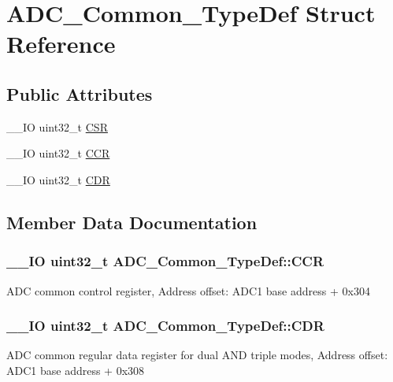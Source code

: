\hypertarget{struct_a_d_c___common___type_def}{}\section{A\+D\+C\+\_\+\+Common\+\_\+\+Type\+Def Struct Reference}
\label{struct_a_d_c___common___type_def}
\subsection*{Public Attributes}
\begin{DoxyCompactItemize}
\item 
\+\_\+\+\_\+\+I\+O uint32\+\_\+t \hyperlink{struct_a_d_c___common___type_def_ac38e24f600f9e134a54a0c43b976a4f4}{C\+S\+R}
\item 
\+\_\+\+\_\+\+I\+O uint32\+\_\+t \hyperlink{struct_a_d_c___common___type_def_aee6d4af7571a1bad2fec9e7b53733277}{C\+C\+R}
\item 
\+\_\+\+\_\+\+I\+O uint32\+\_\+t \hyperlink{struct_a_d_c___common___type_def_a6f7399bf70f677ef5de46a3038f414e1}{C\+D\+R}
\end{DoxyCompactItemize}


\subsection{Member Data Documentation}
\hypertarget{struct_a_d_c___common___type_def_aee6d4af7571a1bad2fec9e7b53733277}{}
\subsubsection[{C\+C\+R}]{\setlength{\rightskip}{0pt plus 5cm}\+\_\+\+\_\+\+I\+O uint32\+\_\+t A\+D\+C\+\_\+\+Common\+\_\+\+Type\+Def\+::\+C\+C\+R}\label{struct_a_d_c___common___type_def_aee6d4af7571a1bad2fec9e7b53733277}
A\+D\+C common control register, Address offset\+: A\+D\+C1 base address + 0x304 \hypertarget{struct_a_d_c___common___type_def_a6f7399bf70f677ef5de46a3038f414e1}{}
\subsubsection[{C\+D\+R}]{\setlength{\rightskip}{0pt plus 5cm}\+\_\+\+\_\+\+I\+O uint32\+\_\+t A\+D\+C\+\_\+\+Common\+\_\+\+Type\+Def\+::\+C\+D\+R}\label{struct_a_d_c___common___type_def_a6f7399bf70f677ef5de46a3038f414e1}
A\+D\+C common regular data register for dual A\+N\+D triple modes, Address offset\+: A\+D\+C1 base address + 0x308 \hypertarget{struct_a_d_c___common___type_def_ac38e24f600f9e134a54a0c43b976a4f4}{}
